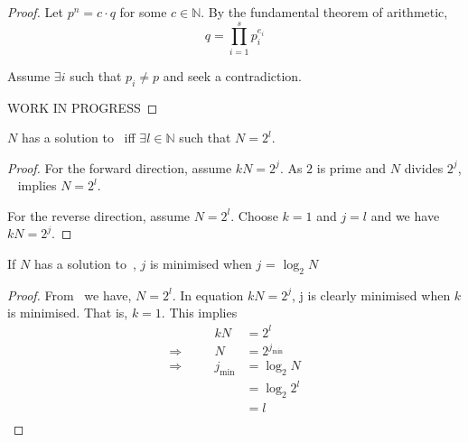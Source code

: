 \documentclass{article}
\begin{document}
\begin{proof}


Let $p^n =c \cdot q$ for some $c \in \mathbb{N}$. By the fundamental theorem of arithmetic,
\begin{equation}
q=\prod_{i=1}^{s} p_i^{e_i}
\end{equation}

Assume $\exists i$ such that $p_i \ne p$ and seek a contradiction.

WORK IN PROGRESS



\end{proof}

\begin{theorem} \label{the:1}
$N$ has a solution to~ iff $\exists l \in \mathbb{N}$ such that $N = 2^l$.
\end{theorem}

\begin{proof}
For the forward direction, assume $kN=2^j$. As $2$ is prime and $N$ divides $2^j$, ~ implies $N=2^l$.

For the reverse direction, assume $N=2^l$. Choose $k=1$ and $j=l$ and we have $kN=2^j$.
\end{proof}

\begin{corollary}
If $N$ has a solution to~, $j$ is minimised when $j$ = $\log_2 N$
\end{corollary}

\begin{proof}
From~ we have, $N=2^l$. In equation $kN=2^j$, j is clearly minimised when $k$ is minimised. That is, $k=1$. This implies
\begin{equation}
\begin{alignedat}{2}
&& kN &= 2^l \\
\Rightarrow\quad && N &= 2^{j_\text{min}} \\
\Rightarrow\quad && j_\text{min} &= \log_2 N \\
&& &= \log_2 2^l \\
&& &= l \\
\end{alignedat}
\end{equation}
\end{proof}
\end{document}
